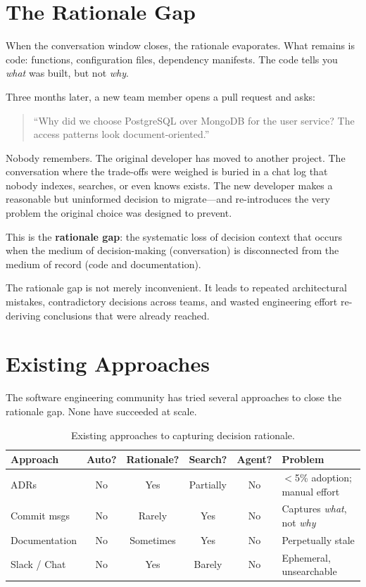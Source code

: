 \section{The Rationale Gap}
\label{sec:rationale-gap}

When the conversation window closes, the rationale evaporates.  What remains
is code: functions, configuration files, dependency manifests.  The code tells
you \emph{what} was built, but not \emph{why}.

Three months later, a new team member opens a pull request and asks:

\begin{quote}
``Why did we choose PostgreSQL over MongoDB for the user service?  The access
patterns look document-oriented.''
\end{quote}

Nobody remembers.  The original developer has moved to another project.  The
conversation where the trade-offs were weighed is buried in a chat log that
nobody indexes, searches, or even knows exists.  The new developer makes a
reasonable but uninformed decision to migrate---and re-introduces the very
problem the original choice was designed to prevent.

This is the \textbf{rationale gap}: the systematic loss of decision context
that occurs when the medium of decision-making (conversation) is disconnected
from the medium of record (code and documentation).

\begin{warning}
The rationale gap is not merely inconvenient.  It leads to repeated
architectural mistakes, contradictory decisions across teams, and wasted
engineering effort re-deriving conclusions that were already reached.
\end{warning}

\section{Existing Approaches}
\label{sec:existing-approaches}

The software engineering community has tried several approaches to close the
rationale gap.  None have succeeded at scale.

\begin{table}[ht]
\centering
\caption{Existing approaches to capturing decision rationale.}
\label{tab:existing-approaches}
\begin{tabularx}{\textwidth}{l c c c c X}
\toprule
\textbf{Approach} & \textbf{Auto?} & \textbf{Rationale?} & \textbf{Search?} & \textbf{Agent?} & \textbf{Problem} \\
\midrule
ADRs           & No  & Yes       & Partially & No & $<$5\% adoption; manual effort \\
Commit msgs    & No  & Rarely    & Yes       & No & Captures \emph{what}, not \emph{why} \\
Documentation  & No  & Sometimes & Yes       & No & Perpetually stale \\
Slack / Chat   & No  & Yes       & Barely    & No & Ephemeral, unsearchable \\
\bottomrule
\end{tabularx}
\end{table}

